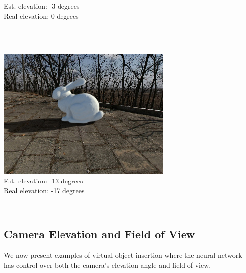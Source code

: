 \begin{multicols}{2}
\begin{minipage}{\linewidth}
Est. elevation: -3 degrees\\
Real elevation: 0 degrees\\
\end{minipage} \\
~\\
\begin{minipage}{\linewidth}
\includegraphics[width=\mywidth]{pano_aczfirgbavyyri.jpg}\\
Est. elevation: -13 degrees\\
Real elevation: -17 degrees\\
\end{minipage} \\

\end{multicols}

\FloatBarrier
\clearpage
\subsection{Camera Elevation and Field of View}

We now present examples of virtual object insertion where the neural
network has control over both the camera's elevation angle and field of
view.


